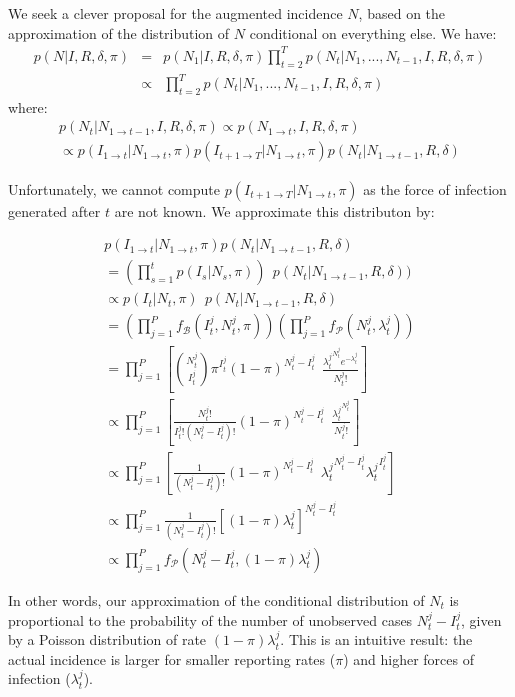 \documentclass[a4paper,11pt]{article}
\begin{document}
We seek a clever proposal for the augmented incidence $N$, based on the 
approximation of the distribution of $N$ 
conditional on everything else.
We have:
\begin{eqnarray}
 p(N|I, R, \delta, \pi) & = & p(N_1 | I, R,
\delta, \pi) \prod_{t=2}^T p(N_t | N_1, ..., N_{t-1}, I, 
R, \delta, \pi) \\
&\propto & \prod_{t=2}^T p(N_t | N_1, ..., N_{t-1}, I, R,
\delta, \pi)
\end{eqnarray}
where:
\begin{eqnarray}
p(N_t | N_{1 \rightarrow t-1}, I, R, \delta, \pi) 
\propto p(N_{1 \rightarrow t}, I, R, \delta, \pi) \\
\propto p( I_{1 \rightarrow t} | N_{1 \rightarrow t}, \pi) p( I_{t+1 
\rightarrow T} | N_{1 \rightarrow t}, \pi) 
p(N_t | N_{1 \rightarrow t-1},  R, \delta)
\end{eqnarray}

Unfortunately, we cannot compute $p( I_{t+1 \rightarrow T} | N_{1 \rightarrow 
t}, \pi) $ as the force of infection generated after $t$ are not known.
We approximate this distributon by:

\begin{eqnarray}
p( I_{1 \rightarrow t} | N_{1 \rightarrow t}, \pi) 
p(N_t | N_{1 \rightarrow t-1},  R, \delta)\\
= (\prod_{s=1}^t p(I_s| N_s, \pi)) \:\:
p(N_t | N_{1 \rightarrow t-1}, R, \delta))  \\
\propto p(I_t | N_t, \pi) \:\:
p(N_t | N_{1 \rightarrow t-1},  R, \delta)\\
= (\prod_{j=1}^P f_{\mathcal{B}}(I_t^j, N_t^j, \pi))
(\prod_{j=1}^P  f_{\mathcal{P}}(N_t^j, \lambda_t^j))\\
= \prod_{j=1}^P [ {N_t^j \choose I_t^j} \pi^{I_t^j} 
(1-\pi)^{N_t^j - I_t^j} \:\: 
\frac{{\lambda_t^j}^{N_t^j} e^{-\lambda_t^j}}{N_t^j!}]\\
\propto \prod_{j=1}^P [ \frac{N_t^j!}{I_t^j!(N_t^j-I_t^j)!} 
(1-\pi)^{N_t^j - I_t^j} \:\: 
\frac{{\lambda_t^j}^{N_t^j}}{N_t^j!}]\\
\propto \prod_{j=1}^P [ \frac{1}{(N_t^j-I_t^j)!} 
(1-\pi)^{N_t^j - I_t^j} \:\: 
{\lambda_t^j}^{N_t^j - I_t^j}{\lambda_t^j}^{I_t^j}]\\
\propto \prod_{j=1}^P \frac{1}{(N_t^j-I_t^j)!} 
[(1-\pi)\lambda_t^j]^{N_t^j - I_t^j}\\
\propto \prod_{j=1}^P f_{\mathcal{P}}(N_t^j-I_t^j , (1-\pi)\lambda_t^j)
\end{eqnarray}

In other words, our approximation of the conditional distribution of $N_t$ is 
proportional to the probability of the number of unobserved cases 
$N_t^j-I_t^j$, given by a Poisson distribution of rate $(1-\pi)\lambda_t^j$. 
This is an intuitive result: the 
actual incidence is larger for smaller reporting rates ($\pi$) and higher 
forces of infection ($\lambda_t^j$).
\end{document}
